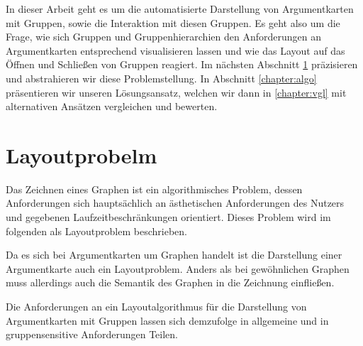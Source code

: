 In dieser Arbeit geht es um die automatisierte Darstellung von Argumentkarten mit Gruppen, sowie die Interaktion mit diesen Gruppen. 
Es geht also um die Frage, wie sich Gruppen und Gruppenhierarchien den Anforderungen an Argumentkarten entsprechend visualisieren lassen 
und wie das Layout auf das Öffnen und Schließen von Gruppen reagiert. 
Im nächsten Abschnitt \ref{chapter:layoutproblem}  präzisieren und abstrahieren wir diese Problemstellung. 
In Abschnitt \ref{chapter:algo} präsentieren wir unseren Lösungsansatz, welchen wir dann in \ref{chapter:vgl} mit alternativen Ansätzen vergleichen und bewerten.





\chapter{Layoutprobelm}
\label{chapter:layoutproblem}
Das Zeichnen eines Graphen ist ein algorithmisches Problem, dessen Anforderungen sich hauptsächlich an ästhetischen Anforderungen des Nutzers und gegebenen Laufzeitbeschränkungen orientiert. Dieses Problem wird im folgenden als Layoutproblem beschrieben.

Da es sich bei Argumentkarten um Graphen handelt ist die Darstellung einer Argumentkarte auch ein Layoutproblem.
Anders als bei gewöhnlichen Graphen muss allerdings auch die Semantik des Graphen in die Zeichnung einfließen.

Die Anforderungen an ein Layoutalgorithmus für die Darstellung von Argumentkarten mit Gruppen lassen sich demzufolge in allgemeine und in gruppensensitive Anforderungen Teilen.

